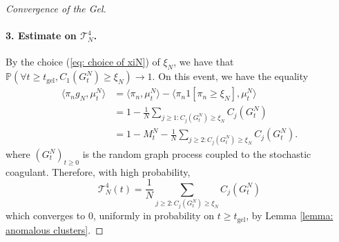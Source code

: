 \begin{proof}[Convergence of the Gel]
       \paragraph{3. Estimate on $\mathcal{T}^4_N$.} By the choice (\ref{eq: choice of xiN}) of $\xi_N$, we have that $\mathbb{P}(\forall  t\geq t_\text{gel}, C_1(G^N_t)\geq \xi_N)\rightarrow 1.$ On this event, we have the equality \begin{equation}
           \begin{split}
               \langle \pi_n g_N, \mu^N_t\rangle &=\langle \pi_n, \mu^N_t\rangle - \langle \pi_n 1[\pi_n\geq \xi_N], \mu^N_t\rangle \\[2ex] & = 1-\frac{1}{N}\sum_{j\geq 1: C_j(G^N_t)\ge \xi_N} C_j(G^N_t) \\[2ex] & = 1-M^N_t-\frac{1}{N}\sum_{j\ge 2:C_j(G^N_t)\ge \xi_N} C_j(G^N_t). 
           \end{split} 
       \end{equation} where $(G^N_t)_{t\geq 0}$ is the random graph process coupled to the stochastic coagulant. Therefore, with high probability, \begin{equation} \mathcal{T}^4_N(t) = \frac{1}{N}\sum_{j\ge 2:C_j(G^N_t)\ge \xi_N} C_j(G^N_t) \end{equation} which converges to $0$, uniformly in probability on $t\geq t_\text{gel}$, by Lemma \ref{lemma: anomalous clusters}.

\end{proof}
